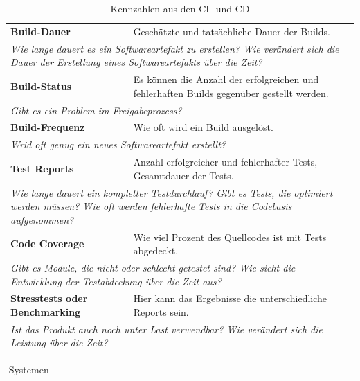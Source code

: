 \begin{table}[H]
  \centering
  \begin{tabular}{p{6.5cm}p{8cm}} \toprule
  \textbf{Build-Dauer} & Geschätzte und tatsächliche Dauer der Builds. \\
  \multicolumn{2}{p{14.5cm}}{\textit{Wie lange dauert es ein Softwareartefakt zu erstellen? \newline Wie verändert sich die Dauer der Erstellung eines Softwareartefakts über die Zeit?}} \\ \midrule
  \textbf{Build-Status} & Es können die Anzahl der erfolgreichen und fehlerhaften Builds gegenüber gestellt werden. \\
  \multicolumn{2}{p{14.5cm}}{\textit{Gibt es ein Problem im Freigabeprozess?}} \\ \midrule
  \textbf{Build-Frequenz} & Wie oft wird ein Build ausgelöst. \\
  \multicolumn{2}{p{14.5cm}}{\textit{Wrid oft genug ein neues Softwareartefakt erstellt?}} \\ \midrule
  \textbf{Test Reports} & Anzahl erfolgreicher und fehlerhafter Tests, Gesamtdauer der Tests. \\
  \multicolumn{2}{p{14.5cm}}{\textit{Wie lange dauert ein kompletter Testdurchlauf? \newline Gibt es Tests, die optimiert werden müssen? \newline Wie oft werden fehlerhafte Tests in die Codebasis aufgenommen?}} \\ \midrule
  \textbf{Code Coverage} & Wie viel Prozent des Quellcodes ist mit Tests abgedeckt. \\
  \multicolumn{2}{p{14.5cm}}{\textit{Gibt es Module, die nicht oder schlecht getestet sind? \newline Wie sieht die Entwicklung der Testabdeckung über die Zeit aus?}} \\ \midrule
  \textbf{Stresstests oder Benchmarking} & Hier kann das Ergebnisse die unterschiedliche Reports sein. \\
  \multicolumn{2}{p{14.5cm}}{\textit{Ist das Produkt auch noch unter Last verwendbar? \newline Wie verändert sich die Leistung über die Zeit?}} \\ \bottomrule
  \end{tabular}
  \caption{Kennzahlen aus den \ac{CI}- und \ac{CD}}-Systemen\label{metrics-table-cicd}
\end{table}

